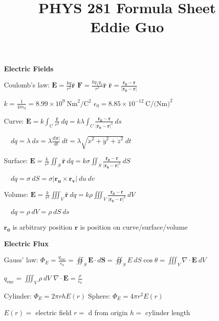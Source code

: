 \documentclass[twocolumn]{article}
\title{
	\vspace{-2em}
	\normalsize \textbf{PHYS 281 Formula Sheet} \\
	\small Eddie Guo \\
	\dotfill
	\vspace{-5em}
}
\date{}
\begin{document}
\maketitle

\small

\textbf{Electric Fields}

Coulomb's law: $\mathbf{E} = \frac{k q}{r^2} \mathbf{\hat{r}}$ \hfill $\mathbf{F} = \frac{k q_1 q_2}{r^2} \mathbf{\hat{r}}$ \hfill $\mathbf{\hat{r}} = \frac{\mathbf{r_0} - \mathbf{r}}{|\mathbf{r_0} - \mathbf{r}|}$

$k = \frac{1}{4 \pi \epsilon_0} = 8.99 \times 10^9\ \text{Nm}^2/\text{C}^2$ \hfill $\epsilon_0 = 8.85 \times 10^{-12}\ \text{C}/\text{(Nm)}^2$

Curve: $\mathbf{E} = k \int_C \frac{\mathbf{\hat{r}}}{r^2}\ dq = k \lambda \int_C \frac{\mathbf{r_0} - \mathbf{r}}{|\mathbf{r_0} - \mathbf{r}|^3}\ ds$

$\quad dq = \lambda\ ds = \lambda \frac{d|\mathbf{r}|}{dt}\ dt = \lambda \sqrt{ \dot{x}^2 + \dot{y}^2 + \dot{z}^2 }\ dt$

Surface: $\mathbf{E} = \frac{k}{r^2} \iint_S \mathbf{\hat{r}}\ dq = k \sigma \iint_S \frac{\mathbf{r_0} - \mathbf{r}}{|\mathbf{r_0} - \mathbf{r}|^3}\ dS$

$\quad dq = \sigma\ dS = \sigma \left| \mathbf{r_u} \times \mathbf{r_v} \right|\ du\ dv$

Volume: $\mathbf{E} = \frac{k}{r^2} \iiint_V \mathbf{\hat{r}}\ dq = k \rho \iiint_V \frac{\mathbf{r_0} - \mathbf{r}}{|\mathbf{r_0} - \mathbf{r}|^3}\ dV$

$\quad dq = \rho\ dV = \rho\ dS\ ds$

$\mathbf{r_0}$ is arbitrary position \hfill $\mathbf{r}$ is position on curve/surface/volume

\vspace{-.5em}
\dotfill

\textbf{Electric Flux}

Gauss' law: $\Phi_E = \frac{q_{\text{enc}}}{\epsilon_0} = \oiint_S \mathbf{E} \cdot d\mathbf{S} = \oiint_S E\ dS \cos \theta = \iiint_V \nabla \cdot \mathbf{E}\ dV$

$q_{\text{enc}} = \iiint_V \rho\ dV$ \hfill $\nabla \cdot \mathbf{E} = \frac{\rho}{\epsilon_0}$

Cylinder: $\Phi_E = 2 \pi r h E(r)$ \hfill Sphere: $\Phi_E = 4 \pi r^2 E(r)$

$E(r) =$ electric field \hfill $r =$ d from origin \hfill $h =$ cylinder length
\end{document}
